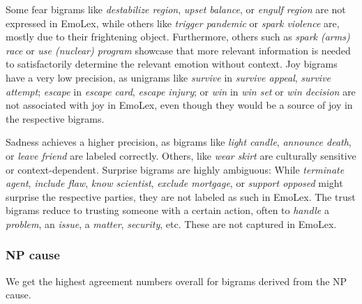 Some fear bigrams like \textit{destabilize region}, \textit{upset balance}, or \textit{engulf region} are not expressed in EmoLex, while others like \textit{trigger pandemic} or \textit{spark violence} are, mostly due to their frightening object. Furthermore, others such as \textit{spark (arms) race} or \textit{use (nuclear) program} showcase that more relevant information is needed to satisfactorily determine the relevant emotion without context. Joy bigrams have a very low precision, as unigrams like \textit{survive} in \textit{survive appeal}, \textit{survive attempt}; \textit{escape} in \textit{escape card}, \textit{escape injury}; or \textit{win} in \textit{win set} or \textit{win decision} are not associated with joy in EmoLex, even though they would be a source of joy in the respective bigrams.

Sadness achieves a higher precision, as bigrams like \textit{light candle}, \textit{announce death}, or \textit{leave friend} are labeled correctly. Others, like \textit{wear skirt} are culturally sensitive or context-dependent.
Surprise bigrams are highly ambiguous: While \textit{terminate agent}, \textit{include flaw}, \textit{know scientist}, \textit{exclude mortgage}, or \textit{support opposed} might surprise the respective parties, they are not labeled as such in EmoLex.
The trust bigrams reduce to trusting someone with a certain action, often to \textit{handle} a \textit{problem}, an \textit{issue}, a \textit{matter}, \textit{security}, etc. These are not captured in EmoLex.

\subsubsection{NP cause}

We get the highest agreement numbers overall for bigrams derived from the NP cause.

